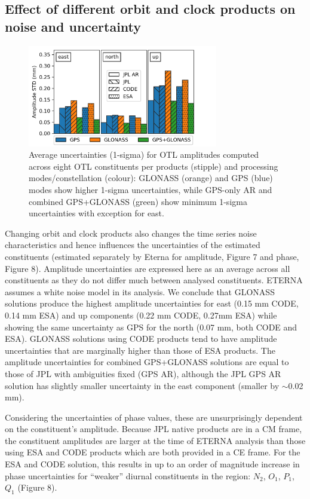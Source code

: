 \documentclass[se, manuscript]{copernicus}
\begin{document}
\subsection{Effect of different orbit and clock products on noise and uncertainty}

\begin{figure}[t]
\includegraphics[width=8.3cm]{fig07.png}
\caption{Average uncertainties (1-sigma) for OTL amplitudes computed across eight OTL constituents per products (stipple) and processing modes/constellation (colour): GLONASS (orange) and GPS (blue) modes show higher 1-sigma uncertainties, while GPS-only AR and combined GPS+GLONASS (green) show minimum 1-sigma uncertainties with exception for east.}
\end{figure}

Changing orbit and clock products also changes the time series noise characteristics and hence influences the uncertainties of the estimated constituents (estimated separately by Eterna for amplitude, Figure 7 and phase, Figure 8). Amplitude uncertainties are expressed here as an average across all constituents as they do not differ much between analysed constituents. ETERNA assumes a white noise model in its analysis. We conclude that GLONASS solutions produce the highest amplitude uncertainties for east (0.15 mm CODE, 0.14 mm ESA) and up components (0.22 mm CODE, 0.27mm ESA) while showing the same uncertainty as GPS for the north (0.07 mm, both CODE and ESA). GLONASS solutions using CODE products tend to have amplitude uncertainties that are marginally higher than those of ESA products. The amplitude uncertainties for combined GPS+GLONASS solutions are equal to those of JPL with ambiguities fixed (GPS AR), although the JPL GPS AR solution has slightly smaller uncertainty in the east component (smaller by $\sim$0.02 mm).

Considering the uncertainties of phase values, these are unsurprisingly dependent on the constituent’s amplitude. Because JPL native products are in a CM frame, the constituent amplitudes are larger at the time of ETERNA analysis than those using ESA and CODE products which are both provided in a CE frame. For the ESA and CODE solution, this results in up to an order of magnitude increase in phase uncertainties for “weaker” diurnal constituents in the region: $N_2$, $O_1$, $P_1$, $Q_1$ (Figure 8).
\end{document}
